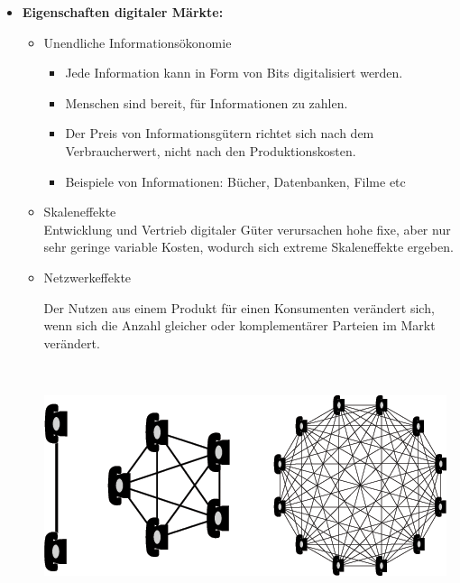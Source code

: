 \documentclass[12pt,a4paper]{article}
\begin{document}
\begin{itemize}
   \item \textbf{Eigenschaften digitaler Märkte:}
         \begin{itemize}
            \item Unendliche Informationsökonomie
                  \begin{itemize}
                     \item Jede Information kann in Form von Bits digitalisiert werden.
                     \item Menschen sind bereit, für Informationen zu zahlen. 
                     \item Der Preis von Informationsgütern richtet sich nach dem Verbraucherwert, nicht nach den Produktionskosten.
                     \item Beispiele von Informationen: Bücher, Datenbanken, Filme etc
                  \end{itemize}
            \item Skaleneffekte\\
                  Entwicklung und Vertrieb digitaler Güter verursachen hohe fixe, aber nur sehr geringe variable Kosten, wodurch sich extreme Skaleneffekte ergeben.
            \item Netzwerkeffekte\\
                  \begin{minipage}[t]{0.6\textwidth}\vspace*{-0.3cm}
                     Der Nutzen aus einem Produkt für einen Konsumenten verändert sich, wenn sich die Anzahl gleicher oder komplementärer Parteien im Markt verändert.
                  \end{minipage} \begin{minipage}[t]{0.05\textwidth}\vspace*{-0.3cm}
                     $\ $\\
                  \end{minipage} \begin{minipage}[t]{0.3\textwidth}\vspace*{-0.3cm}
                     \includegraphics[scale=0.25]{network.png}

\end{minipage}
\end{itemize}
\end{itemize}
\end{document}
